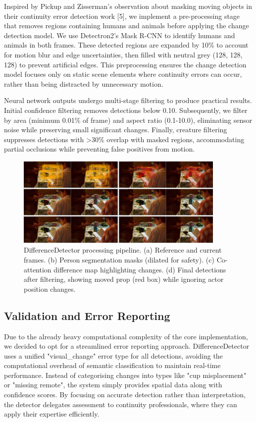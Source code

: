 Inspired by Pickup and Zisserman's observation about masking moving objects in their continuity error detection work [5], we implement a pre-processing stage that removes regions containing humans and animals before applying the change detection model. We use Detectron2's Mask R-CNN to identify humans and animals in both frames. These detected regions are expanded by 10\% to account for motion blur and edge uncertainties, then filled with neutral grey (128, 128, 128) to prevent artificial edges. This preprocessing ensures the change detection model focuses only on static scene elements where continuity errors can occur, rather than being distracted by unnecessary motion.

Neural network outputs undergo multi-stage filtering to produce practical results. Initial confidence filtering removes detections below 0.10. Subsequently, we filter by area (minimum 0.01\% of frame) and aspect ratio (0.1-10.0), eliminating sensor noise while preserving small significant changes. Finally, creature filtering suppresses detections with >30\% overlap with masked regions, accommodating partial occlusions while preventing false positives from motion.

\begin{figure}[h]
\centering
\includegraphics[width=0.9\textwidth]{figures/difference pipeline.png}
\caption{DifferenceDetector processing pipeline. (a) Reference and current frames. (b) Person segmentation masks (dilated for safety). (c) Co-attention difference map highlighting changes. (d) Final detections after filtering, showing moved prop (red box) while ignoring actor position changes.}
\label{fig:difference-pipeline}
\end{figure}

\subsection{Validation and Error Reporting}
Due to the already heavy computational complexity of the core implementation, we decided to opt for a streamlined error reporting approach. DifferenceDetector uses a unified "visual\_change" error type for all detections, avoiding the computational overhead of semantic classification to maintain real-time performance. Instead of categorising changes into types like "cup misplacement" or "missing remote", the system simply provides spatial data along with confidence scores. By focusing on accurate detection rather than interpretation, the detector delegates assessment to continuity professionals, where they can apply their expertise efficiently.

